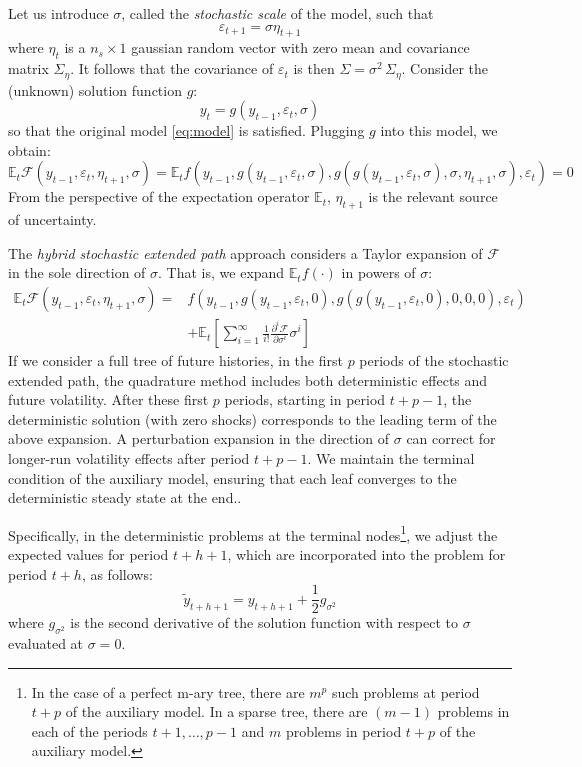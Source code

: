 \documentclass[a4paper,11pt]{amsart}
\begin{document}
Let us introduce $\sigma$, called the \emph{stochastic scale} of the model, such that
\[
   \varepsilon_{t+1} = \sigma \eta_{t+1}
\]
where $\eta_t$ is a $n_s\times 1$ gaussian random vector with zero mean
and covariance matrix $\Sigma_{\eta}$. It follows that the covariance of $\varepsilon_{t}$
is then $\Sigma = \sigma^2 \,\Sigma_{\eta}$. Consider the (unknown) solution function $g$:
\[
   y_t = g\left(y_{t-1}, \varepsilon_t, \sigma\right)
\]
so that the original model \eqref{eq:model} is satisfied. Plugging $g$ into this model, we obtain:
\[
   \mathbb E_t\mathcal F\left( y_{t-1}, \varepsilon_t, \eta_{t+1}, \sigma\right)
   =
   \mathbb E_t f\left(
   y_{t-1},
   g\left(y_{t-1},\varepsilon_t,\sigma\right),
   g\left(g\left(y_{t-1}, \varepsilon_t,\sigma\right), \sigma, \eta_{t+1}, \sigma\right),
   \varepsilon_t\right) = 0
\]
From the perspective of the expectation operator $\mathbb E_t$, $\eta_{t+1}$ is the relevant source of uncertainty.\newline

The \emph{hybrid stochastic extended path} approach considers a Taylor expansion
of $\mathcal F$ in the sole direction of $\sigma$. That is, we expand
$\mathbb E_t f(\cdot)$ in powers of $\sigma$:
\[
   \begin{split}
      \mathbb E_t\mathcal F\left( y_{t-1}, \varepsilon_t, \eta_{t+1}, \sigma\right) =
       & f\left(y_{t-1}, g\left(y_{t-1},\varepsilon_t,0\right),
      g\left(g\left(y_{t-1}, \varepsilon_t,0\right), 0, 0, 0\right),
      \varepsilon_t\right)                                                                                             \\
       & +\mathbb E_t\left[\sum_{i=1}^{\infty}\frac{1}{i!}\frac{\partial^i\mathcal F}{\partial\sigma^i}\sigma^i\right]
   \end{split}
\]
If we consider a full tree of future histories, in the first $p$
periods of the stochastic extended path, the quadrature method
includes both deterministic effects and future volatility. After these
first $p$ periods, starting in period $t+p-1$, the deterministic
solution (with zero shocks) corresponds to the leading term of the
above expansion.  A perturbation expansion in the direction
of $\sigma$ can correct for longer-run volatility effects after
period $t+p-1$. We maintain the terminal condition of the auxiliary
model, ensuring that each leaf converges to the deterministic steady
state at the end..\newline

Specifically, in the deterministic problems at the terminal
nodes\footnote{In the case of a perfect m-ary tree, there are $m^p$
   such problems at period $t+p$ of the auxiliary model. In a sparse
   tree, there are $(m-1)$ problems in each of the
   periods $t+1,\ldots,p-1$ and $m$ problems in period $t+p$ of the
   auxiliary model.}, we adjust the expected values for period $t+h+1$,
which are incorporated into the problem for period $t+h$, as
follows:
\[
   \widetilde{y}_{t+h+1}
   = y_{t+h+1}
   +
   \frac{1}{2}g_{\sigma^2}
\]
where $g_{\sigma^2}$ is the second derivative of the solution
function with respect to $\sigma$ evaluated at $\sigma = 0$.\newline
\end{document}
